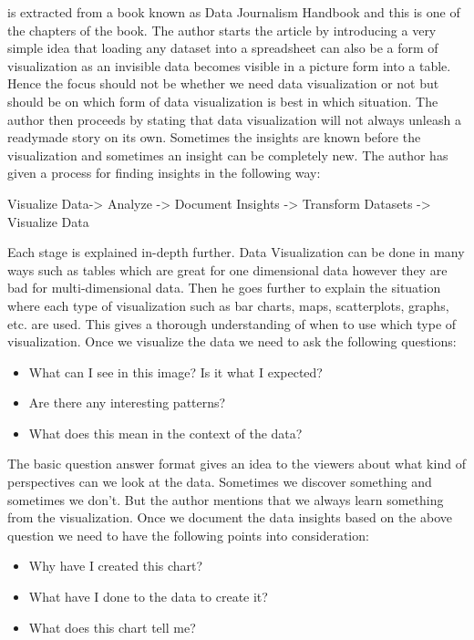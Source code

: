 \documentclass[]{book}
\providecommand{\tightlist}{%
  \setlength{\itemsep}{0pt}\setlength{\parskip}{0pt}}
\theoremstyle{definition}
\theoremstyle{definition}
\theoremstyle{definition}
\theoremstyle{remark}
\begin{document}
\citep{data_journ} is extracted from a book known as Data Journalism
Handbook and this is one of the chapters of the book. The author starts
the article by introducing a very simple idea that loading any dataset
into a spreadsheet can also be a form of visualization as an invisible
data becomes visible in a picture form into a table. Hence the focus
should not be whether we need data visualization or not but should be on
which form of data visualization is best in which situation. The author
then proceeds by stating that data visualization will not always unleash
a readymade story on its own. Sometimes the insights are known before
the visualization and sometimes an insight can be completely new. The
author has given a process for finding insights in the following way:

Visualize Data-\textgreater{} Analyze -\textgreater{} Document Insights
-\textgreater{} Transform Datasets -\textgreater{} Visualize Data

Each stage is explained in-depth further. Data Visualization can be done
in many ways such as tables which are great for one dimensional data
however they are bad for multi-dimensional data. Then he goes further to
explain the situation where each type of visualization such as bar
charts, maps, scatterplots, graphs, etc. are used. This gives a thorough
understanding of when to use which type of visualization. Once we
visualize the data we need to ask the following questions:

\begin{itemize}
\tightlist
\item
  What can I see in this image? Is it what I expected?
\item
  Are there any interesting patterns?
\item
  What does this mean in the context of the data?
\end{itemize}

The basic question answer format gives an idea to the viewers about what
kind of perspectives can we look at the data. Sometimes we discover
something and sometimes we don't. But the author mentions that we always
learn something from the visualization. Once we document the data
insights based on the above question we need to have the following
points into consideration:

\begin{itemize}
\tightlist
\item
  Why have I created this chart?
\item
  What have I done to the data to create it?
\item
  What does this chart tell me?
\end{itemize}
\end{document}
